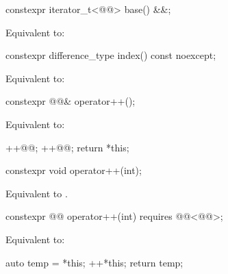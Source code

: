 %
\begin{itemdecl}
constexpr iterator_t<@@> base() &&;
\end{itemdecl}

\begin{itemdescr}
\pnum
\effects
Equivalent to: 
\end{itemdescr}

%
\begin{itemdecl}
constexpr difference_type index() const noexcept;
\end{itemdecl}

\begin{itemdescr}
\pnum
\effects
Equivalent to: 
\end{itemdescr}

%
\begin{itemdecl}
constexpr @@& operator++();
\end{itemdecl}

\begin{itemdescr}
\pnum
\effects
Equivalent to:
\begin{codeblock}
++@@;
++@@;
return *this;
\end{codeblock}
\end{itemdescr}

%
\begin{itemdecl}
constexpr void operator++(int);
\end{itemdecl}

\begin{itemdescr}
\pnum
\effects
Equivalent to .
\end{itemdescr}

%
\begin{itemdecl}
constexpr @@ operator++(int) requires @@<@@>;
\end{itemdecl}

\begin{itemdescr}
\pnum
\effects
Equivalent to:
\begin{codeblock}
auto temp = *this;
++*this;
return temp;
\end{codeblock}
\end{itemdescr}

